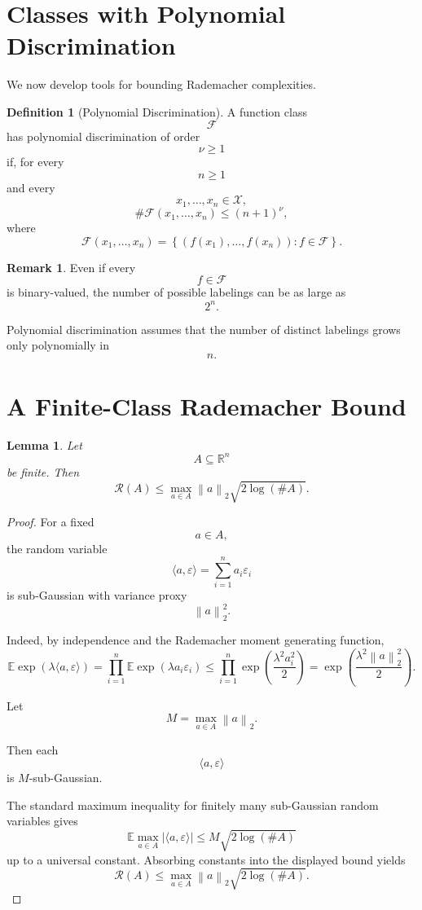 \documentclass[12pt,oneside]{book}
\numberwithin{equation}{section}
\theoremstyle{definition}
\newtheorem{definition}{Definition}[section]
\newtheorem{remark}{Remark}[section]
\theoremstyle{plain}
\newtheorem{lemma}{Lemma}[section]
\theoremstyle{remark}
\newcommand{\R}{\mathbb{R}}
\newcommand{\E}{\mathbb{E}}
\newcommand{\norm}[1]{\left\lVert #1 \right\rVert}
\begin{document}
\section{Classes with Polynomial Discrimination}

We now develop tools for bounding Rademacher complexities.

\begin{definition}[Polynomial Discrimination]
A function class
\[
\mathcal{F}
\]
has polynomial discrimination of order
\[
\nu\geq1
\]
if, for every
\[
n\geq1
\]
and every
\[
x_1,\dots,x_n\in\mathcal{X},
\]
\[
\#\mathcal{F}(x_1,\dots,x_n)
\leq
(n+1)^\nu,
\]
where
\[
\mathcal{F}(x_1,\dots,x_n)
=
\left\{
(f(x_1),\dots,f(x_n)):f\in\mathcal{F}
\right\}.
\]
\end{definition}

\begin{remark}
Even if every
\[
f\in\mathcal{F}
\]
is binary-valued, the number of possible labelings can be as large as
\[
2^n.
\]

Polynomial discrimination assumes that the number of distinct labelings grows only polynomially in
\[
n.
\]
\end{remark}

\section{A Finite-Class Rademacher Bound}

\begin{lemma}
Let
\[
A\subseteq\R^n
\]
be finite. Then
\[
\mathcal{R}(A)
\leq
\max_{a\in A}\norm{a}_2
\sqrt{2\log(\#A)}.
\]
\end{lemma}

\begin{proof}
For a fixed
\[
a\in A,
\]
the random variable
\[
\langle a,\varepsilon\rangle
=
\sum_{i=1}^n a_i\varepsilon_i
\]
is sub-Gaussian with variance proxy
\[
\norm{a}_2^2.
\]

Indeed, by independence and the Rademacher moment generating function,
\[
\E\exp(\lambda\langle a,\varepsilon\rangle)
=
\prod_{i=1}^n
\E\exp(\lambda a_i\varepsilon_i)
\leq
\prod_{i=1}^n
\exp\left(
\frac{\lambda^2a_i^2}{2}
\right)
=
\exp\left(
\frac{\lambda^2\norm{a}_2^2}{2}
\right).
\]

Let
\[
M=\max_{a\in A}\norm{a}_2.
\]

Then each
\[
\langle a,\varepsilon\rangle
\]
is $M$-sub-Gaussian.

The standard maximum inequality for finitely many sub-Gaussian random variables gives
\[
\E\max_{a\in A}
|\langle a,\varepsilon\rangle|
\leq
M\sqrt{2\log(\#A)}
\]
up to a universal constant. Absorbing constants into the displayed bound yields
\[
\mathcal{R}(A)
\leq
\max_{a\in A}\norm{a}_2
\sqrt{2\log(\#A)}.
\]
\end{proof}
\end{document}
